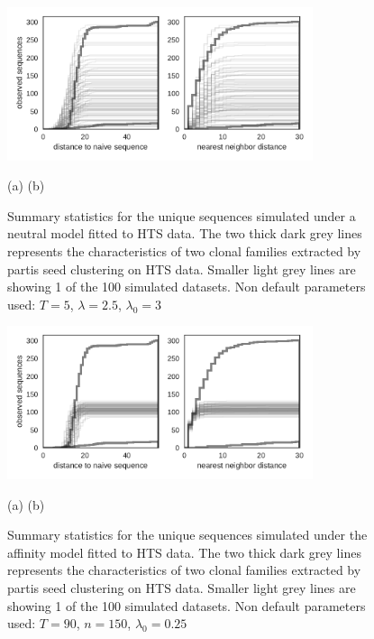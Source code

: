 \begin{figure}[!ht]
    \begin{center}
    \includegraphics[width=0.8\textwidth]{figures/Laura-neutsim_Laura-data.pdf}\newline%
    \end{center}
    \vspace{-14mm} \hspace{44mm} (a) \hspace{50mm} (b)
    \caption{
        \label{fig:Laura-neutsim_Laura-data}
        Summary statistics for the unique sequences simulated under a neutral model fitted to HTS data.
        The two thick dark grey lines represents the characteristics of two clonal families extracted by partis seed clustering on HTS data.
        Smaller light grey lines are showing 1 of the 100 simulated datasets.
        Non default parameters used: $T=5$, $\lambda=2.5$, $\lambda_0=3$
    }
\end{figure}

\begin{figure}[!ht]
    \begin{center}
    \includegraphics[width=0.8\textwidth]{figures/Laura-affsim_Laura-data.pdf}\newline%
    \end{center}
    \vspace{-14mm} \hspace{44mm} (a) \hspace{50mm} (b)
    \caption{
        \label{fig:Laura-affsim_Laura-data}
        Summary statistics for the unique sequences simulated under the affinity model fitted to HTS data.
        The two thick dark grey lines represents the characteristics of two clonal families extracted by partis seed clustering on HTS data.
        Smaller light grey lines are showing 1 of the 100 simulated datasets.
        Non default parameters used: $T=90$, $n=150$, $\lambda_0=0.25$
    }
\end{figure}



